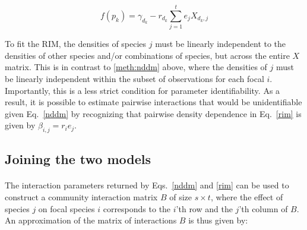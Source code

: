 \documentclass[a4,12pt]{article}
\begin{document}
        \begin{equation}
        f(p_{k}) = \gamma_{d_k} - r_{d_k} \sum_{j=1}^{t} e_{j} X_{d_k, j}
        \label{rim}
        \end{equation}

    To fit the RIM, the densities of species $j$ must be linearly independent to the densities of other species and/or combinations of species, but across the entire $X$ matrix. This is in contrast to \ref{meth:nddm} above, where the densities of $j$ must be linearly independent within the subset of observations for each focal $i$. Importantly, this is a less strict condition for parameter identifiability. As a result, it is possible to estimate pairwise interactions that would be unidentifiable given Eq.~\ref{nddm} by recognizing that pairwise density dependence in Eq.~\ref{rim} is given by $\beta_{i, j} = r_{i} e_{j}$.


    \subsection{Joining the two models}
    \label{meth:addlog}



    \paragraph{}
    The interaction parameters returned by Eqs.~\ref{nddm} and \ref{rim} can be used to construct a community interaction matrix $B$ of size $s \times t$, where the effect of species $j$ on focal species $i$ corresponds to the $i$'th row and the $j$'th column of $B$. An approximation of the matrix of interactions $B$ is thus given by:
\end{document}
